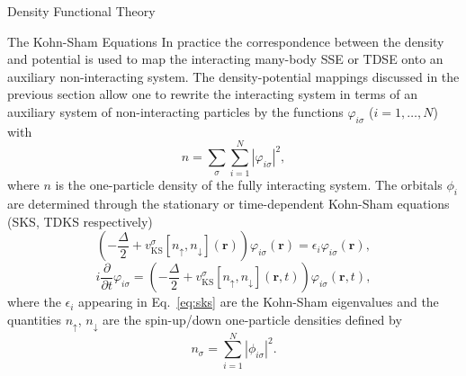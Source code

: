 \documentclass[letterpaper, 12 pt]{report}
\begin{document}
\begin{chapter}{Density Functional Theory \label{chap:dft}}
\begin{section}{The Kohn-Sham Equations \label{sec:ks}}
      In practice the correspondence between the density and potential is used to map the interacting
      many-body SSE or TDSE onto an auxiliary non-interacting system. The density-potential mappings
      discussed in the previous section allow one to rewrite the interacting system in terms of
      an auxiliary system of non-interacting particles by the functions $\varphi_{i\sigma}$ ($i = 1,
      \dots, N$) with
      \begin{equation} \label{eq:dendef2}
         n = \sum\limits_{\sigma} \sum\limits_{i = 1}^N
                           \left| \varphi_{i\sigma} \right|^2,
      \end{equation}
      where $n$ is the one-particle density of the fully interacting system. The orbitals $\phi_i$ are
      determined through the stationary or time-dependent Kohn-Sham equations~\cite{ks-eq, spin-dep1,
      spin-dep3} (SKS, TDKS respectively)
      \begin{equation} \label{eq:sks}
         \left( -\frac{\Delta}{2} + v^\sigma_\mathrm{KS}[n_\uparrow, n_\downarrow](\mathbf{r}) \right)
          \varphi_{i\sigma}(\mathbf{r}) = \epsilon_i \varphi_{i \sigma}(\mathbf{r}),
      \end{equation}
      \begin{equation} \label{eq:tdks}
         i \frac{\partial}{\partial t} \varphi_{i\sigma} = 
            \left( -\frac{\Delta}{2} + v^\sigma_\mathrm{KS}[n_\uparrow, n_\downarrow](\mathbf{r},t)
            \right) \varphi_{i\sigma}(\mathbf{r},t),
      \end{equation}
      where the $\epsilon_i$ appearing in Eq.\ \eqref{eq:sks} are the Kohn-Sham eigenvalues and the
      quantities $n_\uparrow$, $n_\downarrow$ are the spin-up/down one-particle densities defined by
      \begin{equation} \label{eq:spinden}
         n_\sigma = \sum\limits_{i=1}^{N} \left| \phi_{i\sigma} \right|^2.
      \end{equation}


\end{section}
\end{chapter}
\end{document}
